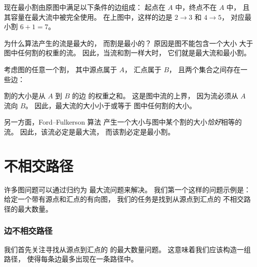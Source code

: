 现在最小割由原图中满足以下条件的边组成：
起点在 $A$ 中，终点不在 $A$ 中，
且其容量在最大流中被完全使用。
在上图中，这样的边是
$2 \rightarrow 3$ 和 $4 \rightarrow 5$，
对应最小割 $6+1=7$。

为什么算法产生的流是最大的，
而割是最小的？
原因是图不能包含一个大小
大于图中任何割的权重的流。
因此，当流和割一样大时，
它们就是最大流和最小割。

考虑图的任意一个割，
其中源点属于 $A$，
汇点属于 $B$，
且两个集合之间存在一些边：

\begin{center}
\end{center}

割的大小是从 $A$ 到 $B$ 的边
的权重之和。
这是图中流的上界，
因为流必须从 $A$ 流向 $B$。
因此，最大流的大小小于或等于
图中任何割的大小。

另一方面，Ford–Fulkerson 算法
产生一个大小与图中某个割的大小\emph{恰好}相等的流。
因此，该流必定是最大流，
而该割必定是最小割。

\section{不相交路径}

许多图问题可以通过归约为
最大流问题来解决。
我们第一个这样的问题示例是：
给定一个带有源点和汇点的有向图，
我们的任务是找到从源点到汇点的
不相交路径的最大数量。

\subsubsection{边不相交路径}

我们首先关注寻找从源点到汇点的
的最大数量问题。
这意味着我们应该构造一组路径，
使得每条边最多出现在一条路径中。

